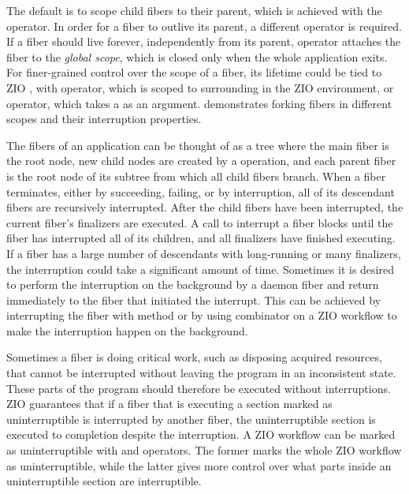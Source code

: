 

The default is to scope child fibers to their parent, which is achieved with the  operator. In order for a fiber to outlive its parent, a different operator is required. If a fiber should live forever, independently from its parent,  operator attaches the fiber to the \emph{global scope}, which is closed only when the whole application exits. For finer-grained control over the scope of a fiber, its lifetime could be tied to ZIO , with  operator, which is scoped to surrounding  in the ZIO environment, or  operator, which takes a  as an argument.  demonstrates forking fibers in different scopes and their interruption properties.



The fibers of an application can be thought of as a tree where the main fiber is the root node, new child nodes are created by a  operation, and each parent fiber is the root node of its subtree from which all child fibers branch. When a fiber terminates, either by succeeding, failing, or by interruption, all of its descendant fibers are recursively interrupted. After the child fibers have been interrupted, the current fiber's finalizers are executed. A call to interrupt a fiber blocks until the fiber has interrupted all of its children, and all finalizers have finished executing. If a fiber has a large number of descendants with long-running or many finalizers, the interruption could take a significant amount of time. Sometimes it is desired to perform the interruption on the background by a daemon fiber and return immediately to the fiber that initiated the interrupt. This can be achieved by interrupting the fiber with  method or by using  combinator on a ZIO workflow to make the interruption happen on the background.

Sometimes a fiber is doing critical work, such as disposing acquired resources, that cannot be interrupted without leaving the program in an inconsistent state. These parts of the program should therefore be executed without interruptions. ZIO guarantees that if a fiber that is executing a section marked as uninterruptible is interrupted by another fiber, the uninterruptible section is executed to completion despite the interruption. A ZIO workflow can be marked as uninterruptible with  and  operators. The former marks the whole ZIO workflow as uninterruptible, while the latter gives more control over what parts inside an uninterruptible section are interruptible.

